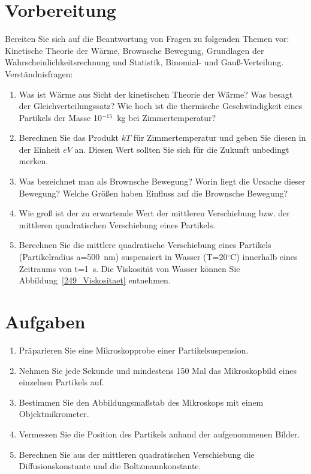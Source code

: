\documentclass{../papanleitung}
\begin{document}
\section{Vorbereitung}
Bereiten Sie sich  auf die Beantwortung von Fragen zu folgenden
Themen vor: Kinetische Theorie der W\"{a}rme, Brownsche Bewegung,
Grundlagen der Wahrscheinlichkeitsrechnung und Statistik,
Binomial- und Gau{\ss}-Verteilung.
\\Verst\"{a}ndnisfragen:
\begin{enumerate}
\item Was ist W\"{a}rme aus Sicht der kinetischen Theorie der W\"{a}rme?
Was besagt der Gleichverteilungssatz? Wie hoch ist die thermische
Geschwindigkeit eines Partikels der Masse 10$^{-15}$~kg bei
Zimmertemperatur?

\item Berechnen Sie das Produkt $kT$ f\"{u}r Zimmertemperatur und
geben Sie diesen in der Einheit $eV$ an. Diesen Wert sollten Sie
sich f\"{u}r die Zukunft unbedingt merken.

\item Was bezeichnet man als Brownsche Bewegung? Worin liegt die
Ursache dieser Bewegung? Welche Gr\"{o}{\ss}en haben Einfluss auf die
Brownsche Bewegung?

\item Wie gro{\ss} ist der zu erwartende Wert der mittleren
Verschiebung bzw. der mittleren quadratischen Verschiebung eines
Partikels.

\item Berechnen Sie die mittlere quadratische Verschiebung eines
Partikels (Partikelradius a=500~nm) suspensiert in Wasser
(T=20$^\circ$C) innerhalb eines Zeitraums von t=1~s. Die
Viskosit\"{a}t von Wasser k\"{o}nnen Sie Abbildung~\ref{249_Viskositaet}
entnehmen.

\end{enumerate}

\section{Aufgaben}
\begin{enumerate}
\item Pr\"{a}parieren Sie eine Mikroskopprobe einer Partikelsuspension. 
\item Nehmen Sie jede
Sekunde und mindestens 150 Mal das Mikroskopbild eines einzelnen
Partikels auf. \item Bestimmen Sie den Abbildungsma{\ss}stab des
Mikroskops mit einem Objektmikrometer.
 \item Vermessen Sie die Position des
Partikels anhand der aufgenommenen Bilder. \item Berechnen Sie aus
der mittleren quadratischen Verschiebung die Diffusionskonstante
und die Boltzmannkonstante.
\end{enumerate}
\end{document}
